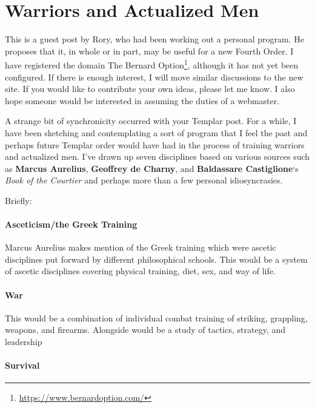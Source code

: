 \section{Warriors and Actualized Men}

\begin{quotex}
This is a guest post by Rory, who had been working out a personal program. He proposes that it, in whole or in part, may be useful for a new Fourth Order. I have registered the domain The Bernard Option\footnote{\url{https://www.bernardoption.com/}}, although it has not yet been configured. If there is enough interest, I will move similar discussions to the new site. If you would like to contribute your own ideas, please let me know. I also hope someone would be interested in assuming the duties of a webmaster. 
\end{quotex}

A strange bit of synchronicity occurred with your Templar post. For a while, I have been sketching and contemplating a sort of program that I feel the past and perhaps future Templar order would have had in the process of training warriors and actualized men. I've drawn up seven disciplines based on various sources such as \textbf{Marcus Aurelius}, \textbf{Geoffrey de Charny}, and \textbf{Baldassare Castiglione}`s \emph{Book of the Courtier} and perhaps more than a few personal idiosyncrasies.

Briefly:

\paragraph{Asceticism/the Greek Training}


Marcus Aurelius makes mention of the Greek training which were ascetic disciplines put forward by different philosophical schools. This would be a system of ascetic disciplines covering physical training, diet, sex, and way of life.

\paragraph{War}


This would be a combination of individual combat training of striking, grappling, weapons, and firearms. Alongside would be a study of tactics, strategy, and leadership

\paragraph{Survival}


